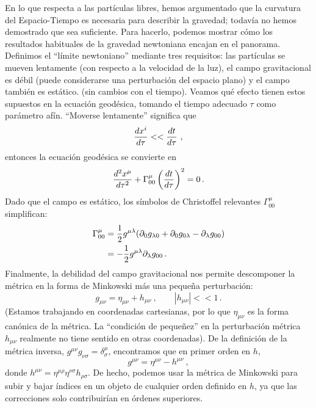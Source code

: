 \documentclass[11pt,b5paper,openany,twoside]{book}
\newcommand{\mn}{{\mu\nu}}
\newcommand{\p}[1]{{\partial_{#1}}}
\begin{document}
En lo que respecta a las partículas libres, hemos argumentado que la curvatura del Espacio-Tiempo es necesaria para describir la gravedad; todavía no hemos demostrado que sea suficiente.
Para hacerlo, podemos mostrar cómo los resultados habituales de la gravedad newtoniana encajan en el panorama.
Definimos el ``límite newtoniano'' mediante tres requisitos: las partículas se mueven lentamente (con respecto a la velocidad de la luz), el campo gravitacional es débil (puede considerarse una perturbación del espacio plano) y el campo también es estático. (sin cambios con el tiempo).
Veamos qué efecto tienen estos supuestos en la ecuación geodésica, tomando el tiempo adecuado $\tau$ como parámetro afín.
``Moverse lentamente'' significa que
\begin{equation}
{{dx^i}\over{d\tau}}<<{{dt}\over{d\tau}}\ ,\label{4.10}
\end{equation}
entonces la ecuación geodésica se convierte en
\begin{equation}
{{d^2 x^\mu}\over{d\tau^2}}+\Gamma^\mu_{00}
\left({{d t}\over{d\tau}}\right)^2 = 0\,.
\label{4.11}
\end{equation}
Dado que el campo es estático, los símbolos de Christoffel relevantes $\Gamma^\mu_{00}$ simplifican:
\begin{align}
\Gamma^\mu_{00} &=  {1\over 2} g^{\mu\lambda}
(\p0 g_{\lambda 0} + \p0 g_{0 \lambda} - \p\lambda g_{00}) \notag \\
&=  - {1\over 2} g^{\mu\lambda}\p\lambda g_{00}\,. \label{4.12}
\end{align}
Finalmente, la debilidad del campo gravitacional nos permite descomponer la métrica en la forma de Minkowski más una pequeña perturbación:
\begin{equation}
g_\mn = \eta_\mn + h_\mn\ ,\qquad |h_\mn |<<1\,.\label{4.13}
\end{equation}
(Estamos trabajando en coordenadas cartesianas, por lo que $\eta_\mn$ es la forma canónica de la métrica.
La ``condición de pequeñez'' en la perturbación métrica $h_\mn$ realmente no tiene sentido en otras coordenadas).
De la definición de la métrica inversa, $g^\mn g_{\nu\sigma}=\delta^\mu_\sigma$, encontramos que en primer orden en $h$,
\begin{equation}
g^\mn = \eta^\mn - h^\mn\ ,\label{4.14}
\end{equation}
donde $h^\mn = \eta^{\mu\rho}\eta^{\nu\sigma}h_{\rho\sigma}$.
De hecho, podemos usar la métrica de Minkowski para subir y bajar índices en un objeto de cualquier orden definido en $h$, ya que las correcciones solo contribuirían en órdenes superiores.
\end{document}
